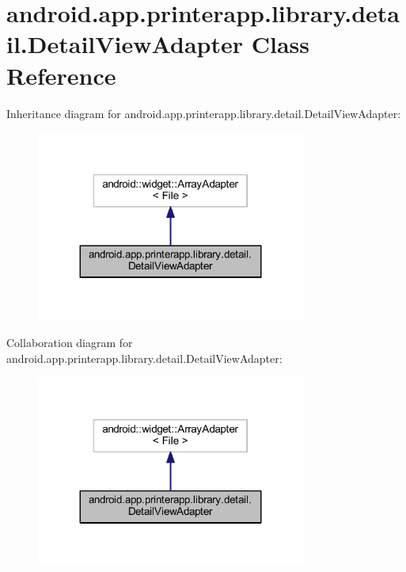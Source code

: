 \hypertarget{classandroid_1_1app_1_1printerapp_1_1library_1_1detail_1_1_detail_view_adapter}{}\section{android.\+app.\+printerapp.\+library.\+detail.\+Detail\+View\+Adapter Class Reference}
\label{classandroid_1_1app_1_1printerapp_1_1library_1_1detail_1_1_detail_view_adapter}


Inheritance diagram for android.\+app.\+printerapp.\+library.\+detail.\+Detail\+View\+Adapter\+:
\nopagebreak
\begin{figure}[H]
\begin{center}
\leavevmode
\includegraphics[width=251pt]{classandroid_1_1app_1_1printerapp_1_1library_1_1detail_1_1_detail_view_adapter__inherit__graph}
\end{center}
\end{figure}


Collaboration diagram for android.\+app.\+printerapp.\+library.\+detail.\+Detail\+View\+Adapter\+:
\nopagebreak
\begin{figure}[H]
\begin{center}
\leavevmode
\includegraphics[width=251pt]{classandroid_1_1app_1_1printerapp_1_1library_1_1detail_1_1_detail_view_adapter__coll__graph}
\end{center}
\end{figure}
